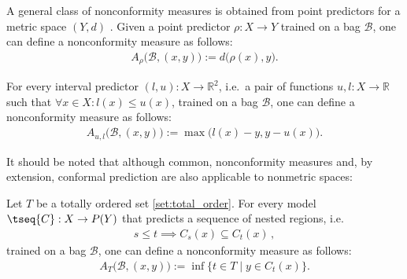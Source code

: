     \begin{example}
        A general class of nonconformity measures is obtained from point predictors for a metric space $(Y,d)$ . Given a point predictor $\rho:X\rightarrow Y$ trained on a bag $\mathcal{B}$, one can define a nonconformity measure as follows:
        \begin{gather}
            A_\rho\big(\mathcal{B},(x,y)\big) := d\big(\rho(x),y\big).
        \end{gather}
    \end{example}
    \begin{example}
        For every interval predictor $(l,u):X\rightarrow\mathbb{R}^2$, i.e.~a pair of functions $u,l:X\rightarrow\mathbb{R}$ such that $\forall x\in X:l(x)\leq u(x)$, trained on a bag $\mathcal{B}$, one can define a nonconformity measure as follows:
        \begin{gather}
            A_{u,l}\big(\mathcal{B},(x,y)\big) := \max\big(l(x)-y,y-u(x)\big).
        \end{gather}
    \end{example}

    It should be noted that although common, nonconformity measures and, by extension, conformal prediction are also applicable to nonmetric spaces:
    \begin{example}
        Let $T$ be a totally ordered set \ref{set:total_order}. For every model $\tseq{C}:X\rightarrow P(Y)$ that predicts a sequence of nested regions, i.e.
        \begin{gather}
            s\leq t\implies C_s(x)\subseteq C_t(x)\,,
        \end{gather}
        trained on a bag $\mathcal{B}$, one can define a nonconformity measure as follows:
        \begin{gather}
            A_T\big(\mathcal{B},(x,y)\big) := \inf\{t\in T\mid y\in C_t(x)\}.
        \end{gather}
    \end{example}

